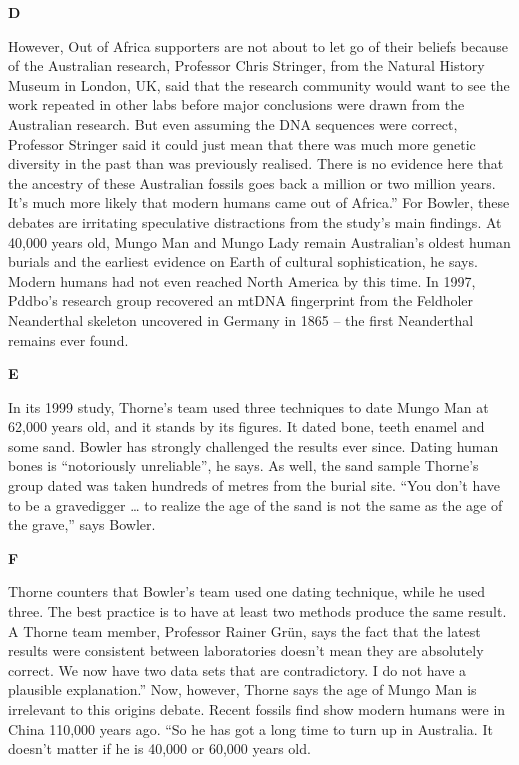 \documentclass{../templateReading/cdreading}
\begin{document}
\textbf{D}\par

However, Out of Africa supporters are not about to let go of their beliefs because of the Australian research, Professor Chris Stringer, from the Natural History Museum in London, UK, said that the research community would want to see the work repeated in other labs before major conclusions were drawn from the Australian research. But even assuming the DNA sequences were correct, Professor Stringer said it could just mean that there was much more genetic diversity in the past than was previously realised. There is no evidence here that the ancestry of these Australian fossils goes back a million or two million years. It’s much more likely that modern humans came out of Africa.” For Bowler, these debates are irritating speculative distractions from the study’s main findings. At 40,000 years old, Mungo Man and Mungo Lady remain Australian’s oldest human burials and the earliest evidence on Earth of cultural sophistication, he says. Modern humans had not even reached North America by this time. In 1997, Pddbo’s research group recovered an mtDNA fingerprint from the Feldholer Neanderthal skeleton uncovered in Germany in 1865 – the first Neanderthal remains ever found.

\textbf{E}\par

In its 1999 study, Thorne’s team used three techniques to date Mungo Man at 62,000 years old, and it stands by its figures. It dated bone, teeth enamel and some sand. Bowler has strongly challenged the results ever since. Dating human bones is “notoriously unreliable”, he says. As well, the sand sample Thorne’s group dated was taken hundreds of metres from the burial site. “You don’t have to be a gravedigger … to realize the age of the sand is not the same as the age of the grave,” says Bowler.

\textbf{F}\par

Thorne counters that Bowler’s team used one dating technique, while he used three. The best practice is to have at least two methods produce the same result. A Thorne team member, Professor Rainer Grün, says the fact that the latest results were consistent between laboratories doesn’t mean they are absolutely correct. We now have two data sets that are contradictory. I do not have a plausible explanation.” Now, however, Thorne says the age of Mungo Man is irrelevant to this origins debate. Recent fossils find show modern humans were in China 110,000 years ago. “So he has got a long time to turn up in Australia. It doesn’t matter if he is 40,000 or 60,000 years old.
\end{document}
